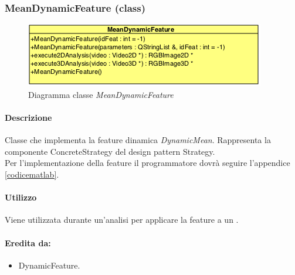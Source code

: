 \begin{itemize}
	\end{itemize}
	
\color{black}
\pagebreak
\subsubsection{MeanDynamicFeature (class)}
\label{MeanDynamicFeature}
\begin{figure}[!h]
\centering
			\includegraphics[scale=1]{./Content/Immagini/modelCore/MeanDynamicFeature.png}
			\caption{Diagramma classe \textsl{MeanDynamicFeature}}
			\label{DynamicMeanFeature_img}
\end{figure}

\paragraph{Descrizione \\} Classe che implementa la feature\g{} dinamica \textit{DynamicMean}. Rappresenta la componente ConcreteStrategy del design pattern\g{} Strategy.
\\Per l'implementazione della feature\g{} il programmatore dovrà seguire l'appendice \ref{codicematlab}.

\paragraph{Utilizzo\\} Viene utilizzata durante un'analisi per applicare la feature\g{} a un \dataset{}.

\paragraph{Eredita da:}
\begin{itemize}
	\item DynamicFeature.
\end{itemize}


